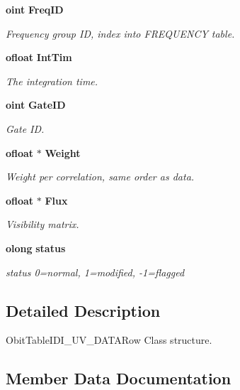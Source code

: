 \begin{CompactItemize}
{\bf oint} {\bf Freq\-ID}
\begin{CompactList}\small\item\em Frequency group ID, index into FREQUENCY table. \item\end{CompactList}\item 
{\bf ofloat} {\bf Int\-Tim}
\begin{CompactList}\small\item\em The integration time. \item\end{CompactList}\item 
{\bf oint} {\bf Gate\-ID}
\begin{CompactList}\small\item\em Gate ID. \item\end{CompactList}\item 
{\bf ofloat} $\ast$ {\bf Weight}
\begin{CompactList}\small\item\em Weight per correlation, same order as data. \item\end{CompactList}\item 
{\bf ofloat} $\ast$ {\bf Flux}
\begin{CompactList}\small\item\em Visibility matrix. \item\end{CompactList}\item 
{\bf olong} {\bf status}
\begin{CompactList}\small\item\em status 0=normal, 1=modified, -1=flagged \item\end{CompactList}\end{CompactItemize}


\subsection{Detailed Description}
Obit\-Table\-IDI\_\-UV\_\-DATARow Class structure. 



\subsection{Member Data Documentation}
